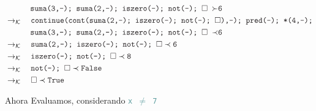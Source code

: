 \documentclass{article}
\newcommand{\tx}[1]{\textcolor{Black} {\texttt{#1}}}
\newcommand{\tp}[1]{\textcolor{CadetBlue} {\texttt{#1}}}
\newcommand{\es}{$\square$}
\newcommand{\push}[2]{ \tx{#1} \prec \tx{#2}}
\newcommand{\kr}{\rightarrow_{\mathcal{K}} \quad}
\begin{document}
\begin{enumerate}
\begin{enumerate}
\begin{align*}
			&\tx {\quad \quad \quad suma(3,-); suma(2,-); iszero(-); not(-); \es  $\ \succ $6}\\
			&\kr \tx{continue(cont(suma(2,-); iszero(-); not(-); \es),-); pred(-); *(4,-);}\\
			&\tx {\quad \quad \quad suma(3,-); suma(2,-); iszero(-); not(-); \es  $\ \prec $6}\\
			&\kr \push {suma(2,-); iszero(-); not(-); \es}{6}\\
			&\kr \push {iszero(-); not(-); \es}{8}\\
			&\kr \push {not(-); \es}{False}\\
			&\kr \push {\es}{True}\\
			\end{align*} 

			
			Ahora 	Evaluamos, considerando \tp{x $\neq$ 7}
			

\end{enumerate}
\end{enumerate}
\end{document}
